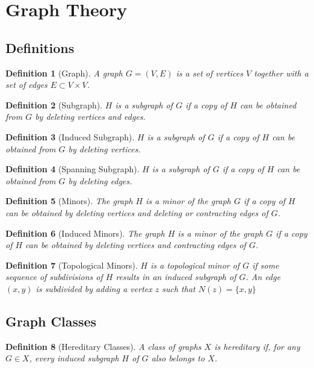 \documentclass[]{article}
\theoremstyle{break}
\theoremstyle{break}
\newtheorem{definition}{Definition}[section]
\begin{document}
\section{Graph Theory}
\subsection{Definitions}
\begin{definition}[Graph]
	A graph $G=(V,E)$ is a set of vertices $V$ together with a set of edges $E \subset V \times V$.
\end{definition}
\begin{definition}[Subgraph]
	$H$ is a subgraph of $G$ if a copy of $H$ can be obtained from $G$ by deleting vertices and edges. 
\end{definition}
\begin{definition}[Induced Subgraph]
	$H$ is a subgraph of $G$ if a copy of $H$ can be obtained from $G$ by deleting vertices.
\end{definition}
\begin{definition}[Spanning Subgraph]
	$H$ is a subgraph of $G$ if a copy of $H$ can be obtained from $G$ by deleting edges.
\end{definition}
\begin{definition}[Minors]
	The graph $H$ is a minor of the graph $G$ if a copy of $H$ can be obtained by deleting vertices and deleting or contracting edges of $G$. 
\end{definition}
\begin{definition}[Induced Minors]
	The graph $H$ is a minor of the graph $G$ if a copy of $H$ can be obtained by deleting vertices and contracting edges of $G$. 
\end{definition}
\begin{definition}[Topological Minors]
	$H$ is a topological minor of $G$ if some sequence of subdivisions of $H$ results in an induced subgraph of $G$. An edge $(x,y)$ is subdivided by adding a vertex $z$ such that $N(z)= \{x,y\}$ 
\end{definition}

\subsection{Graph Classes}
	\begin{definition}[Hereditary Classes]
		A class of graphs $X$ is hereditary if, for any $G \in X$, every induced subgraph $H$ of $G$ also belongs to $X$.
	\end{definition}
	
\end{document}
